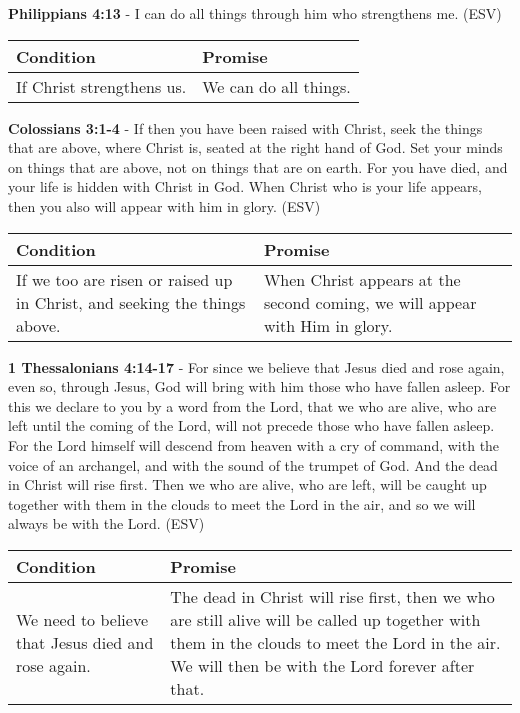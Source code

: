 \documentclass[11pt]{article}
\begin{document}
\textbf{Philippians 4:13} -  I can do all things through him who strengthens me.  (ESV)

\begin{center}
\begin{tabular}{ll}
Condition & Promise\\[0pt]
\hline
If Christ strengthens us. & We can do all things.\\[0pt]
\end{tabular}
\end{center}

\textbf{Colossians 3:1-4} -  If then you have been raised with Christ, seek the things that are above, where Christ is, seated at the right hand of God.  Set your minds on things that are above, not on things that are on earth.  For you have died, and your life is hidden with Christ in God.  When Christ who is your life appears, then you also will appear with him in glory.  (ESV)

\begin{center}
\begin{tabular}{ll}
Condition & Promise\\[0pt]
\hline
If we too are risen or raised up in Christ, and seeking the things above. & When Christ appears at the second coming, we will appear with Him in glory.\\[0pt]
\end{tabular}
\end{center}

\textbf{1 Thessalonians 4:14-17} -  For since we believe that Jesus died and rose again, even so, through Jesus, God will bring with him those who have fallen asleep.  For this we declare to you by a word from the Lord, that we who are alive, who are left until the coming of the Lord, will not precede those who have fallen asleep.  For the Lord himself will descend from heaven with a cry of command, with the voice of an archangel, and with the sound of the trumpet of God.  And the dead in Christ will rise first.  Then we who are alive, who are left, will be caught up together with them in the clouds to meet the Lord in the air, and so we will always be with the Lord.  (ESV)

\begin{center}
\begin{tabular}{ll}
Condition & Promise\\[0pt]
\hline
We need to believe that Jesus died and rose again. & The dead in Christ will rise first, then we who are still alive will be called up together with them in the clouds to meet the Lord in the air. We will then be with the Lord forever after that.\\[0pt]
\end{tabular}
\end{center}
\end{document}
